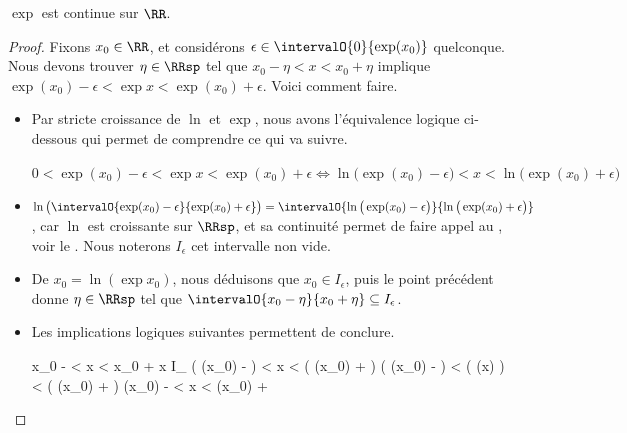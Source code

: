 \begin{fact} \label{exp-cont}
	$\exp$ est continue sur $\RR$.
\end{fact}


\begin{proof}
	Fixons $x_0 \in \RR$, et considérons $\epsilon \in \intervalO{0}{\exp(x_0)}$ quelconque.
	Nous devons trouver $\eta \in \RRsp$ tel que
	$x_0 - \eta < x < x_0 + \eta$
	implique
	$\exp(x_0) - \epsilon < \exp x < \exp(x_0) + \epsilon$. Voici comment faire.
	\begin{itemize}
		\item Par stricte croissance de $\ln$ et $\exp$, nous avons l'équivalence logique ci-dessous qui permet de comprendre ce qui va suivre.

		\noindent$
			0 < \exp(x_0) - \epsilon < \exp x < \exp(x_0) + \epsilon
			\iff
			\ln \big( \exp(x_0) - \epsilon \big) < x < \ln \big( \exp(x_0) + \epsilon \big)
		$


		\item
		$\ln \big( \intervalO{\exp(x_0) - \epsilon}{\exp(x_0) + \epsilon} \big)
		=
		 \intervalO{\ln \big( \exp(x_0) - \epsilon \big)}{\ln \big( \exp(x_0) + \epsilon \big)}$,
		 car $\ln$ est croissante sur $\RRsp$, et sa continuité permet de faire appel au \tvi, voir le .
		Nous noterons $I_{\epsilon}$ cet intervalle non vide.


		\item De $x_0 = \ln(\exp x_0)$, nous déduisons que $x_0 \in I_{\epsilon}$,
		puis le point précédent donne $\eta \in \RRsp$ tel que
		$\intervalO{x_0 - \eta}{x_0 + \eta} \subseteq I_{\epsilon}$.


		\item Les implications logiques suivantes permettent de conclure.

		\smallskip
		\leavevmode\kern-19pt\begin{stepcalc}[style=ar*, ope=\implies]
			x_0 - \eta < x < x_0 + \eta
		\explnext*{$\intervalO{x_0 - \eta}{x_0 + \eta} \subseteq I_{\epsilon}$}{}
			x \in I_{\epsilon}
		\explnext{}
			\ln \big( \exp(x_0) - \epsilon \big) < x < \ln \big( \exp(x_0) + \epsilon \big)
		\explnext{}
			\ln \big( \exp(x_0) - \epsilon \big) < \ln \big( \exp(x) \big) < \ln \big( \exp(x_0) + \epsilon \big)
			\exp(x_0) - \epsilon < \exp x < \exp(x_0) + \epsilon
		\end{stepcalc}
	\end{itemize}

	\null
	\vspace{-4.5ex}
\end{proof}


